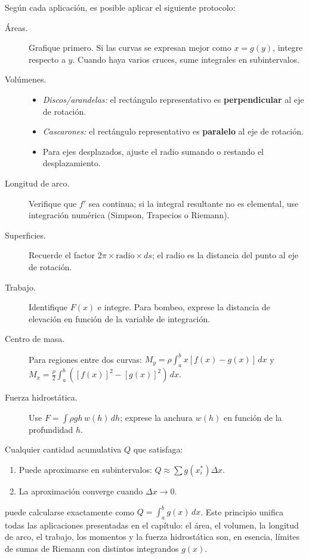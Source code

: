 \begin{rem} Según cada aplicación, es posible aplicar el siguiente protocolo:
\begin{description}
  \item[Áreas.] Grafique primero. Si las curvas se expresan mejor como
    $x=g(y)$, integre respecto a $y$. Cuando haya varios cruces, sume
    integrales en subintervalos.

  \item[Volúmenes.]
    \begin{itemize}
      \item \emph{Discos/arandelas:} el rectángulo representativo es
        \textbf{perpendicular} al eje de rotación.
      \item \emph{Cascarones:} el rectángulo representativo es
        \textbf{paralelo} al eje de rotación.
      \item Para ejes desplazados, ajuste el radio sumando o restando el
        desplazamiento.
    \end{itemize}

  \item[Longitud de arco.] Verifique que $f'$ sea continua; si la integral
    resultante no es elemental, use integración numérica (Simpson, Trapecios
    o Riemann).

  \item[Superficies.] Recuerde el factor $2\pi\times\text{radio}\times ds$;
    el radio es la distancia del punto al eje de rotación.

  \item[Trabajo.] Identifique $F(x)$ e integre. Para bombeo, exprese la
    distancia de elevación en función de la variable de integración.

  \item[Centro de masa.] Para regiones entre dos curvas:
    $M_y=\rho\int_a^b x[f(x)-g(x)]\,dx$ y
    $M_x=\frac{\rho}{2}\int_a^b([f(x)]^2-[g(x)]^2)\,dx$.

  \item[Fuerza hidrostática.] Use $F=\int\rho g h\,w(h)\,dh$; exprese la
    anchura $w(h)$ en función de la profundidad $h$.
\end{description}
\end{rem}

\begin{theorem}
Cualquier cantidad acumulativa $Q$ que satisfaga:
\begin{enumerate}
  \item Puede aproximarse en subintervalos: $Q\approx\sum g(x_i^*)\Delta x$.
  \item La aproximación converge cuando $\Delta x\to 0$.
\end{enumerate}
puede calcularse exactamente como $Q=\int_a^b g(x)\,dx$. Este principio
unifica todas las aplicaciones presentadas en el capítulo: el área, el
volumen, la longitud de arco, el trabajo, los momentos y la fuerza
hidrostática son, en esencia, límites de sumas de Riemann con distintos
integrandos $g(x)$.
\end{theorem}

